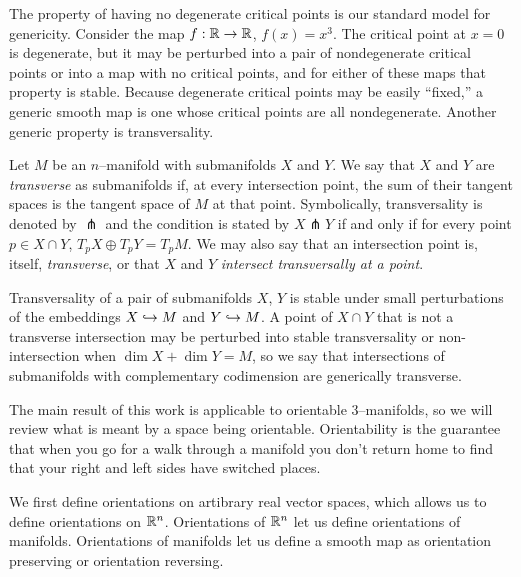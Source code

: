 The property of having no degenerate critical points is our standard model for genericity.
Consider the map $f:\mathbb{R}\to\mathbb{R}$, $f(x)=x^3$.
The critical point at $x=0$ is degenerate, but it may be perturbed into a pair of nondegenerate critical points or into a map with no critical points, and for either of these maps that property is stable.
Because degenerate critical points may be easily ``fixed,'' a generic smooth map is one whose critical points are all nondegenerate.
Another generic property is transversality.

\begin{defn}
	Let $M$ be an $n$--manifold with submanifolds $X$ and $Y$.
	We say that $X$ and $Y$ are \emph{transverse} as submanifolds if, at every intersection point, the sum of their tangent spaces is the tangent space of $M$ at that point.
	Symbolically, transversality is denoted by $\pitchfork$ and the condition is stated by $X\pitchfork Y$ if and only if for every point $p\in X\cap Y$, $T_p X\oplus T_p Y=T_p M$.
	We may also say that an intersection point is, itself, \emph{transverse}, or that $X$ and $Y$ \emph{intersect transversally at a point}.	
\end{defn}

Transversality of a pair of submanifolds $X$, $Y$ is stable under small perturbations of the embeddings $X\hookrightarrow M$ and $Y\hookrightarrow M$.
A point of $X\cap Y$ that is not a transverse intersection may be perturbed into stable transversality or non-intersection when $\dim X + \dim Y = M$, so we say that intersections of submanifolds with complementary codimension are generically transverse.

The main result of this work is applicable to orientable 3--manifolds, so we will review what is meant by a space being orientable.
Orientability is the guarantee that when you go for a walk through a manifold you don't return home to find that your right and left sides have switched places.

We first define orientations on artibrary real vector spaces, which allows us to define orientations on $\mathbb{R}^n$.
Orientations of $\mathbb{R}^n$ let us define orientations of manifolds.
Orientations of manifolds let us define a smooth map as orientation preserving or orientation reversing.


